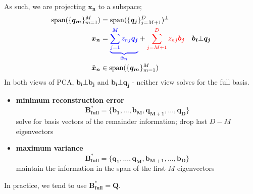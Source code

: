 \documentclass[a4paper, 12pt]{article}
\newcommand{\summation}[2]{\sum\limits_{#1}^{#2}}
\newcommand{\mat}[1]{\boldsymbol{#1}}
\renewcommand{\vec}[1]{\boldsymbol{#1}}
\newcommand{\blue}[1]{\textcolor{blue}{#1}}
\newcommand{\red}[1]{\textcolor{red}{#1}}
\begin{document}
            As such, we are projecting $\mat{x_n}$ to a subspace;
            \begin{align*}
                \mathrm{span}(\{ \mat{q_m} \}_{m = 1}^M) & = \mathrm{span}(\{\mat{q_j}\}_{j = M + 1}^D)^\bot \\
                \vec{x_n} & = \blue{\underbrace{\summation{j = 1}{M} z_{nj}\mat{q_j}}_{\tilde{\mat{x}}_{\mat{n}}}} + \red{\summation{j = M + 1}{D} z_{nj}\mat{b_j}} & \mat{b_i} \bot \mat{q_j} \\
                \tilde{\mat{x}}_{\mat{n}} & \in \mathrm{span}(\{ \mat{q_m} \}_{m = 1}^M)
            \end{align*}
            In both views of PCA, $\mat{b_i} \bot \mat{b_j}$ and $\mat{b_i} \bot \mat{q_j}$ - neither view solves for the full basis.
            \begin{itemize}
                \itemsep0em
                \item \textbf{minimum reconstruction error}
                    $$\mat{B_\text{full}^*} = \{ \mat{b_1}, \dots, \mat{b_M}, \mat{q_{M + 1}}, \dots, \mat{q_D} \}$$
                    solve for basis vectors of the remainder information; drop last $D - M$ eigenvectors
                \item \textbf{maximum variance}
                    $$\mat{B_\text{full}^*} = \{ \mat{q_1}, \dots, \mat{q_M}, \mat{b_{M + 1}}, \dots, \mat{b_D} \}$$
                    maintain the information in the span of the first $M$ eigenvectors
            \end{itemize}
            In practice, we tend to use $\mat{B_\text{full}^*} = \mat{Q}$.
\end{document}
